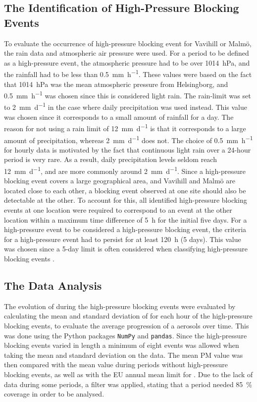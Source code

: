 \subsection{The Identification of High-Pressure Blocking Events}
To evaluate the occurrence of high-pressure blocking event for Vavihill or Malmö, the rain data and atmospheric air pressure were used. For a period to be defined as a high-pressure event, the atmospheric pressure had to be over \SI{1014}{\hecto\pascal}, and the rainfall had to be less than \SI{0.5}{\mm\per\hour}. These values were based on the fact that \SI{1014}{\hecto\pascal} was the mean atmospheric pressure from Helsingborg, and \SI{0.5}{\mm\per\hour} was chosen since this is considered light rain. The rain-limit was set to \SI{2}{\mm\per\day} in the case where daily precipitation was used instead. This value was chosen since it corresponds to a small amount of rainfall for a day. The reason for not using a rain limit of \SI{12}{\mm\per\day} is that it corresponds to a large amount of precipitation, whereas \SI{2}{\mm\per\day} does not. The choice of \SI{0.5}{\mm\per\hour} for hourly data is motivated by the fact that continuous light rain over a 24-hour period is very rare. As a result, daily precipitation levels seldom reach \SI{12}{\mm\per\day}, and are more commonly around \SI{2}{\mm\per\day}. Since a high-pressure blocking event covers a large geographical area, and Vavihill and Malmö are located close to each other, a blocking event observed at one site should also be detectable at the other. To account for this, all identified high-pressure blocking events at one location were required to correspond to an event at the other location within a maximum time difference of \SI{5}{\hour} for the initial five days. For a high-pressure event to be considered a high-pressure blocking event, the criteria for a high-pressure event had to persist for at least \SI{120}{\hour} (5 days). This value was chosen since a 5-day limit is often considered when classifying high-pressure blocking events \cite{lupoAtmosphericBlockingEvents2020}. 

\subsection{The Data Analysis}
The evolution of \PM during the high-pressure blocking events were evaluated by calculating the mean and standard deviation of \PM for each hour of the high-pressure blocking events, to evaluate the average progression of a aerosols over time. This was done using the Python packages \texttt{NumPy} and \texttt{pandas}. Since the high-pressure blocking events varied in length a minimum of eight events was allowed when taking the mean and standard deviation on the \PM data. The mean PM value was then compared with the mean \PM value during periods without high-pressure blocking events, as well as with the EU annual mean limit for \PM. Due to the lack of \PM data during some periods, a filter was applied, stating that a period needed \SI{85}{\%} \PM coverage in order to be analysed.

